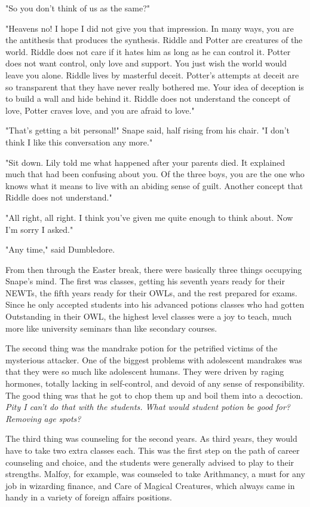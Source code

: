 \documentclass[a4paper,11pt]{article}
\begin{document}
"So you don't think of us as the same?"

"Heavens no! I hope I did not give you that impression. In many ways, you are the antithesis that produces the synthesis. Riddle and Potter are creatures of the world. Riddle does not care if it hates him as long as he can control it. Potter does not want control, only love and support. You just wish the world would leave you alone. Riddle lives by masterful deceit. Potter's attempts at deceit are so transparent that they have never really bothered me. Your idea of deception is to build a wall and hide behind it. Riddle does not understand the concept of love, Potter craves love, and you are afraid to love."

"That's getting a bit personal!" Snape said, half rising from his chair. "I don't think I like this conversation any more."

"Sit down. Lily told me what happened after your parents died. It explained much that had been confusing about you. Of the three boys, you are the one who knows what it means to live with an abiding sense of guilt. Another concept that Riddle does not understand."

"All right, all right. I think you've given me quite enough to think about. Now I'm sorry I asked."

"Any time," said Dumbledore.

From then through the Easter break, there were basically three things occupying Snape's mind. The first was classes, getting his seventh years ready for their NEWTs, the fifth years ready for their OWLs, and the rest prepared for exams. Since he only accepted students into his advanced potions classes who had gotten Outstanding in their OWL, the highest level classes were a joy to teach, much more like university seminars than like secondary courses.

The second thing was the mandrake potion for the petrified victims of the mysterious attacker. One of the biggest problems with adolescent mandrakes was that they were so much like adolescent humans. They were driven by raging hormones, totally lacking in self-control, and devoid of any sense of responsibility. The good thing was that he got to chop them up and boil them into a decoction. \emph{Pity I can't do that with the students. What would student potion be good for? Removing age spots?}

The third thing was counseling for the second years. As third years, they would have to take two extra classes each. This was the first step on the path of career counseling and choice, and the students were generally advised to play to their strengths. Malfoy, for example, was counseled to take Arithmancy, a must for any job in wizarding finance, and Care of Magical Creatures, which always came in handy in a variety of foreign affairs positions.
\end{document}

